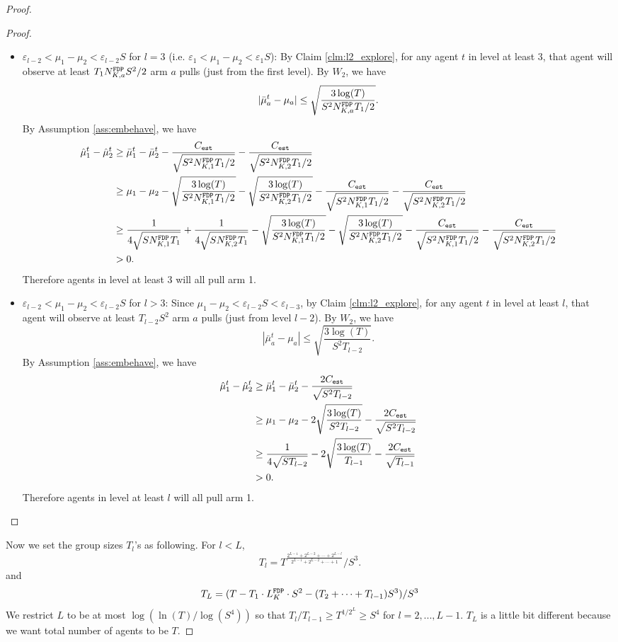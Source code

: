 \begin{proof}
\begin{proof}
\begin{itemize}
\item $\varepsilon_{l-2} < \mu_1 - \mu_2 < \varepsilon_{l-2}S$ for $l =3$ (i.e. $\varepsilon_1 < \mu_1 - \mu_2 < \varepsilon_1S$): By Claim \ref{clm:l2_explore}, for any agent $t$ in level at least $3$, that agent will observe at least $T_1\fdpN S^2/2$ arm $a$ pulls (just from the first level). By $W_2$, we have
\[
|\bar{\mu}_a^t - \mu_a| \leq \sqrt{\frac{3\log(T)}{S^2\fdpN T_1/2}}.
\]
By Assumption \ref{ass:embehave}, we have
\begin{align*}
\hat{\mu}_1^t - \hat{\mu}_2^t &\geq \bar{\mu}_1^t - \bar{\mu}_2^t - \frac{\estC}{\sqrt{S^2\fdpN[1]T_1/2}}-\frac{\estC}{\sqrt{S^2\fdpN[2]T_1/2}}  \\
&\geq \mu_1 -\mu_2 -  \sqrt{\frac{3\log(T)}{S^2\fdpN[1]T_1/2}}- \sqrt{\frac{3\log(T)}{S^2\fdpN[2]T_1/2}}- \frac{\estC}{\sqrt{S^2\fdpN[1]T_1/2}}-\frac{\estC}{\sqrt{S^2\fdpN[2]T_1/2}}  \\
&\geq\frac{1}{4\sqrt{S\fdpN[1]T_1}} + \frac{1}{4\sqrt{S\fdpN[2]T_1}}  -  \sqrt{\frac{3\log(T)}{S^2\fdpN[1]T_1/2}}- \sqrt{\frac{3\log(T)}{S^2\fdpN[2]T_1/2}}- \frac{\estC}{\sqrt{S^2\fdpN[1]T_1/2}}-\frac{\estC}{\sqrt{S^2\fdpN[2]T_1/2}}  \\
&>0.
\end{align*}
Therefore agents in level at least 3 will all pull arm 1. 

\item $\varepsilon_{l-2} < \mu_1 - \mu_2 < \varepsilon_{l-2}S$ for $l >3$: Since $\mu_1-\mu_2 < \varepsilon_{l-2}S < \varepsilon_{l-3}$, by Claim \ref{clm:l2_explore}, for any agent $t$ in level at least $l$, that agent will observe at least $T_{l-2}S^2$ arm $a$ pulls (just from level $l-2$). By $W_2$, we have
\[
|\bar{\mu}_a^t - \mu_a| \leq \sqrt{\frac{3\log(T)}{S^2T_{l-2}}}.
\]
By Assumption \ref{ass:embehave}, we have
\begin{align*}
\hat{\mu}_1^t - \hat{\mu}_2^t &\geq \bar{\mu}_1^t - \bar{\mu}_2^t - \frac{2\estC}{\sqrt{S^2T_{l-2}}} \\
&\geq \mu_1 -\mu_2 - 2 \sqrt{\frac{3\log(T)}{S^2T_{l-2}}}- \frac{2\estC}{\sqrt{S^2T_{l-2}}} \\
&\geq\frac{1}{4\sqrt{ST_{l-2}}} -  2 \sqrt{\frac{3\log(T)}{T_{l-1}}}- \frac{2\estC}{\sqrt{T_{l-1}}} \\
&>0.
\end{align*}
Therefore agents in level at least $l$ will all pull arm 1. 
\end{itemize}
\end{proof}

Now we set the group sizes $T_l$'s as following. For $l < L$,
\[
T_l = T^{\frac{2^{L-1} + 2^{L-2} + \cdots + 2^{L-l}}{2^{L-1}+ 2^{L-2} + \cdots + 1}}/S^3.
\]
and 
\[
T_L = (T - T_1 \cdot \GdT\cdot S^2 - (T_2 + \cdots + T_{l-1}) S^3) /S^3
\]
We restrict $L$ to be at most $\log(\ln(T)/\log(S^4))$ so that $T_l / T_{l-1} \geq T^{1/2^L} \geq S^4$ for $l = 2,...,L-1$. $T_L$ is a little bit different because we want total number of agents to be $T$. 


\end{proof}
